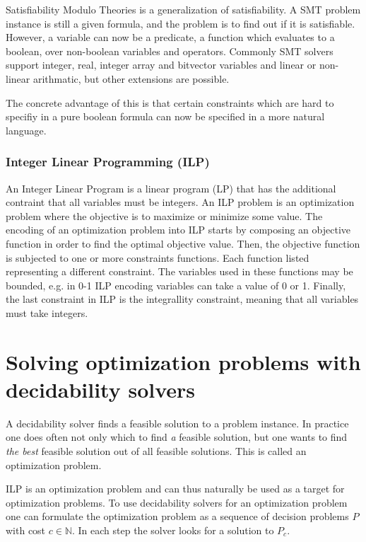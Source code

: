 \documentclass{sig-alternate}
\begin{document}
Satisfiability Modulo Theories is a generalization of satisfiability.
A SMT problem instance is still a given formula, and the problem is to find out if it is satisfiable.
However, a variable can now be a predicate, a function which evaluates to a boolean, over non-boolean variables and operators.
Commonly SMT solvers support integer, real, integer array and bitvector variables and linear or non-linear arithmatic, but other extensions are possible.

The concrete advantage of this is that certain constraints which are hard to specifiy in a pure boolean formula can now be specified in a more natural language.

\subsubsection*{Integer Linear Programming (ILP)}

An Integer Linear Program is a linear program (LP) that has the additional contraint that all variables must be integers. 
An ILP problem is an optimization problem where the objective is to maximize or minimize some value. 
The encoding of an optimization problem into ILP starts by composing an objective function in order to find the optimal objective value.
Then, the objective function is subjected to one or more constraints functions. Each function listed representing a different constraint.
The variables used in these functions may be bounded, e.g. in 0-1 ILP encoding variables can take a value of 0 or 1.
Finally, the last constraint in ILP is the integrallity constraint, meaning that all variables must take integers.

\section{Solving optimization problems with decidability solvers}
\label{sec:OptWithDec}

A decidability solver finds a feasible solution to a problem instance.
In practice one does often not only which to find \emph{a} feasible solution, but one wants to find \emph{the best} feasible solution out of all feasible solutions.
This is called an optimization problem.

ILP is an optimization problem and can thus naturally be used as a target for optimization problems.
To use decidability solvers for an optimization problem one can formulate the optimization problem as a sequence of decision problems $P$ with cost $c \in \mathbb{N}$.
In each step the solver looks for a solution to $P_c$.
\end{document}
